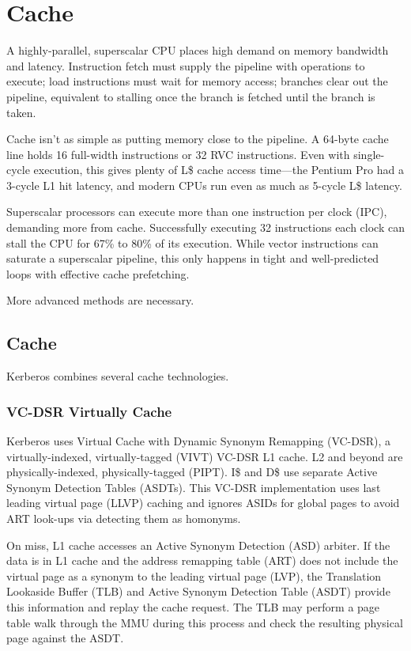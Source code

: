 \chapter{Cache}

A highly-parallel, superscalar CPU places high demand on memory bandwidth and
latency.  Instruction fetch must supply the pipeline with operations to
execute; load instructions must wait for memory access; branches clear out the
pipeline, equivalent to stalling once the branch is fetched until the branch is
taken.

Cache isn't as simple as putting memory close to the pipeline.  A 64-byte cache
line holds 16 full-width instructions or 32 RVC instructions.  Even with
single-cycle execution, this gives plenty of L\$ cache access time—the Pentium
Pro had a 3-cycle L1 hit latency, and modern CPUs run even as much as 5-cycle
L\$ latency.

Superscalar processors can execute more than one instruction per clock (IPC),
demanding more from cache.  Successfully executing 32 instructions each clock
can stall the CPU for 67\% to 80\% of its execution.  While vector instructions
can saturate a superscalar pipeline, this only happens in tight and
well-predicted loops with effective cache prefetching.

More advanced methods are necessary.

\section{Cache}

Kerberos combines several cache technologies.

\subsection{VC-DSR Virtually Cache}

Kerberos uses Virtual Cache with Dynamic Synonym Remapping (VC-DSR), a
virtually-indexed, virtually-tagged (VIVT) VC-DSR L1 cache.  L2 and beyond are
physically-indexed, physically-tagged (PIPT).  I\$ and D\$ use separate Active
Synonym Detection Tables (ASDTs).  This VC-DSR implementation uses last leading
virtual page (LLVP) caching and ignores ASIDs for global pages to avoid ART
look-ups via detecting them as homonyms.

On miss, L1 cache accesses an Active Synonym Detection (ASD) arbiter.  If the
data is in L1 cache and the address remapping table (ART) does not include the
virtual page as a synonym to the leading virtual page (LVP), the Translation
Lookaside Buffer (TLB) and Active Synonym Detection Table (ASDT) provide this
information and replay the cache request.  The TLB may perform a page table
walk through the MMU during this process and check the resulting physical page
against the ASDT.

